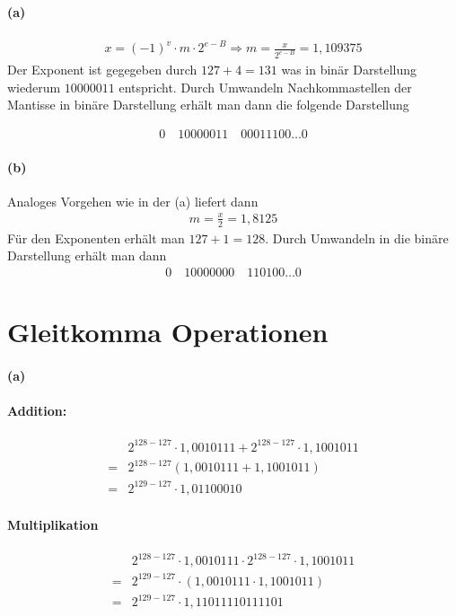 \documentclass[a4paper]{article}
\begin{document}
\paragraph{(a)}
\begin{align*}
    x=(-1)^v\cdot m \cdot2^{e-B} \Rightarrow m=\frac{x}{2^{e-B}}=1,109375
\end{align*}
Der Exponent ist gegegeben durch $127+4=131$ was in binär Darstellung wiederum $10000011$ entspricht. Durch Umwandeln Nachkommastellen der Mantisse in binäre Darstellung erhält man dann die folgende Darstellung

\begin{align*}
    0 \quad 10000011 \quad 00011100\dots 0
\end{align*}

\paragraph{(b)}
Analoges Vorgehen wie in der (a) liefert dann
\begin{align*}
    m=\frac{x}{2}=1,8125
\end{align*}
Für den Exponenten erhält man $127+1=128$. Durch Umwandeln in die binäre Darstellung erhält man dann
\begin{align*}
    0 \quad 10000000 \quad 110100\dots 0
\end{align*}


\section{Gleitkomma Operationen}
\paragraph{(a)}
\paragraph{Addition:}
\begin{align*}
    &2^{128-127}\cdot 1,0010111+2^{128-127}\cdot1,1001011\\
    =&2^{128-127}(1,0010111+1,1001011)\\
    =&2^{129-127}\cdot 1,01100010
\end{align*}

\paragraph{Multiplikation}
\begin{align*}
    &2^{128-127}\cdot 1,0010111 \cdot 2^{128-127}\cdot1,1001011\\
    =&2^{129-127}\cdot(1,0010111\cdot 1,1001011)\\
    =&2^{129-127}\cdot 1,11011110111101
\end{align*}
\end{document}

